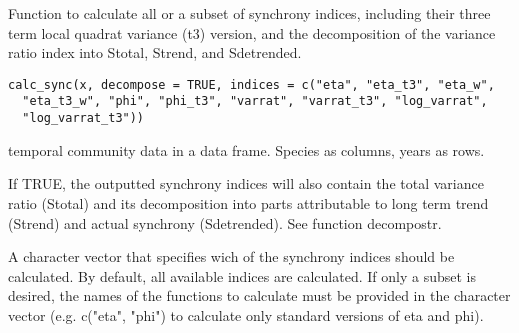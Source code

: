 %
\begin{Description}\relax
Function to calculate all or a subset of synchrony indices, including their
three term local quadrat variance (t3) version, and the decomposition of the
variance ratio index into Stotal, Strend, and Sdetrended.
\end{Description}
%
\begin{Usage}
\begin{verbatim}
calc_sync(x, decompose = TRUE, indices = c("eta", "eta_t3", "eta_w",
  "eta_t3_w", "phi", "phi_t3", "varrat", "varrat_t3", "log_varrat",
  "log_varrat_t3"))
\end{verbatim}
\end{Usage}
%
\begin{Arguments}
\begin{ldescription}
\item[\code{x}] temporal community data in a data frame. Species as columns, years
as rows.

\item[\code{decompose}] If TRUE, the outputted synchrony indices will also contain
the total variance ratio (Stotal) and its decomposition into parts
attributable to long term trend (Strend) and actual synchrony (Sdetrended).
See function decompostr.

\item[\code{indices}] A character vector that specifies wich of the synchrony
indices should be calculated. By default, all available indices are
calculated. If only a subset is desired, the names of the functions to
calculate must be provided in the character vector (e.g. c("eta", "phi") to
calculate only standard versions of eta and phi).
\end{ldescription}
\end{Arguments}
%
